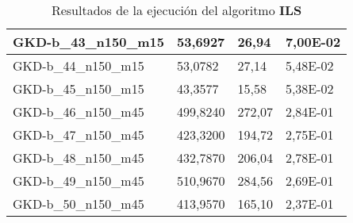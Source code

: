 \begin{table}[!ht]
\begin{adjustbox}{height=12cm}
\begin{tabular}{|l|l|l|l|}
        GKD-b\_43\_n150\_m15 & 53,6927  & 26,94         & 7,00E-02 \\ \hline
        GKD-b\_44\_n150\_m15 & 53,0782  & 27,14         & 5,48E-02 \\ \hline
        GKD-b\_45\_n150\_m15 & 43,3577  & 15,58         & 5,38E-02 \\ \hline
        GKD-b\_46\_n150\_m45 & 499,8240 & 272,07        & 2,84E-01 \\ \hline
        GKD-b\_47\_n150\_m45 & 423,3200 & 194,72        & 2,75E-01 \\ \hline
        GKD-b\_48\_n150\_m45 & 432,7870 & 206,04        & 2,78E-01 \\ \hline
        GKD-b\_49\_n150\_m45 & 510,9670 & 284,56        & 2,69E-01 \\ \hline
        GKD-b\_50\_n150\_m45 & 413,9570 & 165,10        & 2,37E-01 \\ \hline
    \end{tabular}
    \end{adjustbox}
    \caption{Resultados de la ejecución del algoritmo \textbf{ILS}}
\end{table}

\pagebreak